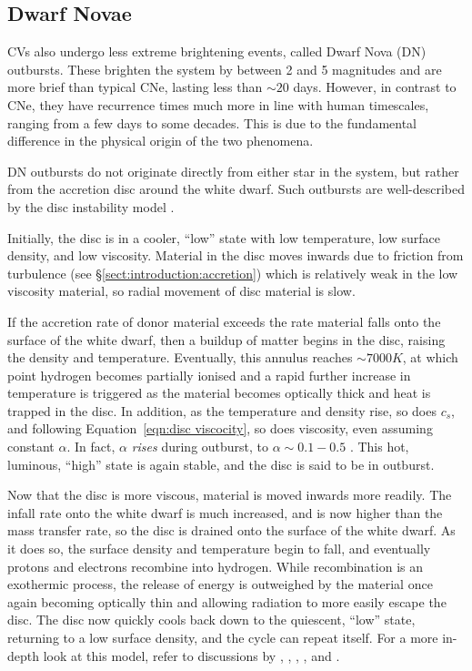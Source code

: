 \subsection{Dwarf Novae}
\label{sect:introduction:dwarf novae}

CVs also undergo less extreme brightening events, called Dwarf Nova (DN) outbursts. These brighten the system by between 2 and 5 magnitudes \citep{warner1995} and are more brief than typical CNe, lasting less than $\sim 20$ days. However, in contrast to CNe, they have recurrence times much more in line with human timescales, ranging from a few days to some decades. This is due to the fundamental difference in the physical origin of the two phenomena.

DN outbursts do not originate directly from either star in the system, but rather from the accretion disc around the white dwarf. Such outbursts are well-described by the disc instability model \citep{cannizzo1993, dubus2018}.

Initially, the disc is in a cooler, ``low'' state with low temperature, low surface density, and low viscosity. Material in the disc moves inwards due to friction from turbulence (see \S\ref{sect:introduction:accretion}) which is relatively weak in the low viscosity material, so radial movement of disc material is slow.

If the accretion rate of donor material exceeds the rate material falls onto the surface of the white dwarf, then a buildup of matter begins in the disc, raising the density and temperature. Eventually, this annulus reaches $\sim 7000K$, at which point hydrogen becomes partially ionised and a rapid further increase in temperature is triggered as the material becomes optically thick and heat is trapped in the disc. In addition, as the temperature and density rise, so does $c_s$, and following Equation~\ref{eqn:disc viscocity}, so does viscosity, even assuming constant $\alpha$. In fact, $\alpha$ {\it rises} during outburst, to $\alpha \sim 0.1 - 0.5$ \citep{hellier2001}. This hot, luminous, ``high'' state is again stable, and the disc is said to be in outburst. 

Now that the disc is more viscous, material is moved inwards more readily. The infall rate onto the white dwarf is much increased, and is now higher than the mass transfer rate, so the disc is drained onto the surface of the white dwarf. As it does so, the surface density and temperature begin to fall, and eventually protons and electrons recombine into hydrogen. While recombination is an exothermic process, the release of energy is outweighed by the material once again becoming optically thin and allowing radiation to more easily escape the disc. The disc now quickly cools back down to the quiescent, ``low'' state, returning to a low surface density, and the cycle can repeat itself. For a more in-depth look at this model, refer to discussions by \citet{cannizzo1993}, \citet{osaki1996}, \citet{warner1995}, \citep{hellier2001}, and \citet{Hameury2002}.

